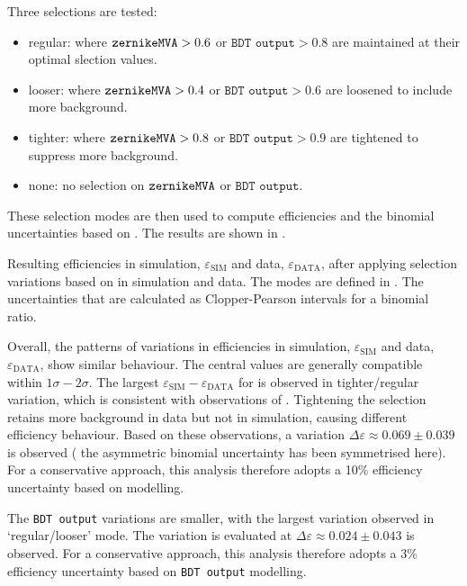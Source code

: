 Three selections are tested:
\begin{itemize}
    \item regular: where ${\texttt{zernikeMVA}}>0.6$ or $\texttt{BDT~output}>0.8$ are maintained at their optimal slection values.
    \item looser: where ${\texttt{zernikeMVA}}>0.4$ or $\texttt{BDT~output}>0.6$ are loosened to include more background.
    \item tighter: where ${\texttt{zernikeMVA}}>0.8$ or $\texttt{BDT~output}>0.9$ are tightened to suppress more background.
    \item none: no selection on ${\texttt{zernikeMVA}}$ or $\texttt{BDT~output}$.
\end{itemize}
These selection modes are then used to compute efficiencies and the binomial uncertainties based on .
The results are shown in .
\begin{table}[htbp!]
    \centering
    \caption{\label{tab:blinded_efficiency} 
    Resulting efficiencies in simulation, $\varepsilon_{\mathrm{SIM}}$ and data, $\varepsilon_{\mathrm{DATA}}$,
    after applying selection variations based on 
     in simulation and data. 
    The modes are defined in .
    The uncertainties that are calculated as Clopper-Pearson intervals for a binomial ratio. 
    }
    
\end{table}

Overall, the patterns of variations in efficiencies in simulation, $\varepsilon_{\mathrm{SIM}}$ and data, $\varepsilon_{\mathrm{DATA}}$, show similar behaviour.
The central values are generally compatible within $1\sigma-2\sigma$.
The largest $\varepsilon_{\mathrm{SIM}}-\varepsilon_{\mathrm{DATA}}$ for \ZMVA is observed in tighter/regular variation, which is consistent with observations of .
Tightening the selection retains more background in data but not in simulation, causing different efficiency behaviour.
Based on these observations, a variation $\Delta\varepsilon\approx0.069\pm0.039$ is observed
( the asymmetric binomial uncertainty has been symmetrised here).
For a conservative approach, this analysis therefore adopts a 10\% efficiency uncertainty based on \ZMVA modelling.

The \texttt{BDT~output} variations are smaller, with the largest variation observed in `regular/looser' mode.
The variation is evaluated at $\Delta\varepsilon\approx0.024\pm0.043$ is observed.
For a conservative approach, this analysis therefore adopts a 3\% efficiency uncertainty based on \texttt{BDT~output} modelling.

